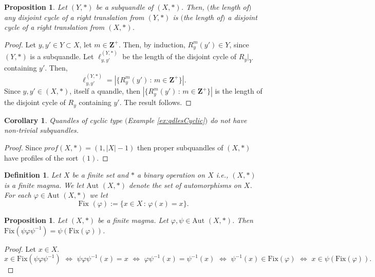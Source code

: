 \documentclass{article}
\newtheorem{corollary}[theorem]{Corollary}
\newtheorem{proposition}[theorem]{Proposition}
\newtheorem{definition}[theorem]{Definition}
\begin{document}
\begin{proposition}\label{prop:subquandle}
Let $(Y, *)$ be a subquandle of $(X, *)$. Then, $($the length of$)$ any disjoint cycle of a right translation from $(Y, *)$ is $($the length of$)$ a disjoint cycle of a right translation from $(X, *)$.
\end{proposition}
\begin{proof}
Let $y, y'\in Y\subset X$, let $m\in \mathbf{Z}^+$. Then, by induction, $R_y^m(y')\in Y$, since $(Y, *)$ is a subquandle.
Let $\ell_{y, y'}^{(Y, *)}$ be the length of the disjoint cycle of ${R_y}\big|_Y$ containing $y'$. Then, $$\ell_{y, y'}^{(Y, *)}=|\{ R_y^m(y')\, :\, m\in \mathbf{Z}^+ \}| .$$ Since $y,y'\in (X, *)$, itself a quandle, then $|\{ R_y^m(y')\, :\, m\in \mathbf{Z}^+ \}|$ is the length of the disjoint cycle of $R_y$ containing $y'$. The result follows.
\end{proof}

\begin{corollary}
Quandles of cyclic type $($Example \ref{ex:qdlesCyclic}$)$ do not have non-trivial subquandles.
\end{corollary}
\begin{proof}
Since $prof(X, *) = (1, |X|-1)$ then proper subquandles of $(X, *)$ have profiles of the sort $(1)$.
\end{proof}

\begin{definition}
Let $X$ be a finite set and $*$ a binary operation on $X$ i.e., $(X, *)$ is a finite magma. We let $\text{Aut }(X, *)$ denote the set of automorphisms on $X$. For each $\varphi\in \text{Aut }(X, *)$ we let $$\text{Fix }(\varphi) :=\{ x \in X \, :\, \varphi (x) = x \} .$$
\end{definition}

\begin{proposition}\label{prop:Fix}
Let  $(X, *)$ be a finite magma. Let $\varphi, \psi \in \text{Aut }(X, *)$. Then $\text{Fix}(\psi\varphi\psi^{-1})=\psi(\text{Fix}(\varphi))$.
\end{proposition}
\begin{proof}
Let $x\in X$. $$x\in \text{Fix}(\psi\varphi\psi^{-1})\,\,\Longleftrightarrow\,\, \psi\varphi\psi^{-1}(x)=x\,\,\Longleftrightarrow\,\, \varphi\psi^{-1}(x)=\psi^{-1}(x)\,\,\Longleftrightarrow\,\, \psi^{-1}(x) \in \text{Fix}(\varphi)\,\,\Longleftrightarrow\,\, x\in \psi(\text{Fix}(\varphi)).$$
\end{proof}
\end{document}
